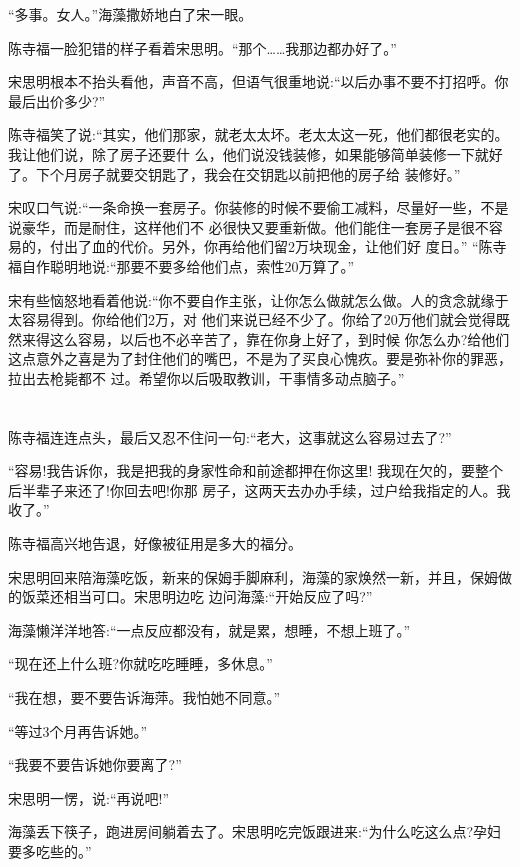 \documentclass[11pt,a4paper,onecolumn]{article}
\begin{document}
``多事。女人。''海藻撒娇地白了宋一眼。

陈寺福一脸犯错的样子看着宋思明。``那个……我那边都办好了。''

宋思明根本不抬头看他，声音不高，但语气很重地说:``以后办事不要不打招呼。你最后出价多少?''

陈寺福笑了说:``其实，他们那家，就老太太坏。老太太这一死，他们都很老实的。我让他们说，除了房子还要什
么，他们说没钱装修，如果能够简单装修一下就好了。下个月房子就要交钥匙了，我会在交钥匙以前把他的房子给
装修好。''

宋叹口气说:``一条命换一套房子。你装修的时候不要偷工减料，尽量好一些，不是说豪华，而是耐住，这样他们不
必很快又要重新做。他们能住一套房子是很不容易的，付出了血的代价。另外，你再给他们留2万块现金，让他们好
度日。'' ``陈寺福自作聪明地说:``那要不要多给他们点，索性20万算了。''

宋有些恼怒地看着他说:``你不要自作主张，让你怎么做就怎么做。人的贪念就缘于太容易得到。你给他们2万，对
他们来说已经不少了。你给了20万他们就会觉得既然来得这么容易，以后也不必辛苦了，靠在你身上好了，到时候
你怎么办?给他们这点意外之喜是为了封住他们的嘴巴，不是为了买良心愧疚。要是弥补你的罪恶，拉出去枪毙都不
过。希望你以后吸取教训，干事情多动点脑子。''

\section[\thesection]{}

陈寺福连连点头，最后又忍不住问一句:``老大，这事就这么容易过去了?''

``容易!我告诉你，我是把我的身家性命和前途都押在你这里! 我现在欠的，要整个后半辈子来还了!你回去吧!你那
房子，这两天去办办手续，过户给我指定的人。我收了。''

陈寺福高兴地告退，好像被征用是多大的福分。

宋思明回来陪海藻吃饭，新来的保姆手脚麻利，海藻的家焕然一新，并且，保姆做的饭菜还相当可口。宋思明边吃
边问海藻:``开始反应了吗?''

海藻懒洋洋地答:``一点反应都没有，就是累，想睡，不想上班了。''

``现在还上什么班?你就吃吃睡睡，多休息。''

``我在想，要不要告诉海萍。我怕她不同意。''

``等过3个月再告诉她。''

``我要不要告诉她你要离了?''

宋思明一愣，说:``再说吧!''

海藻丢下筷子，跑进房间躺着去了。宋思明吃完饭跟进来:``为什么吃这么点?孕妇要多吃些的。''
\end{document}
